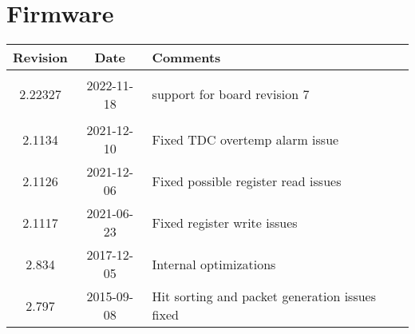 \section{Firmware}
\begin{tabularx}{\textwidth}{|c|c|X|}
    \hline
    Revision & Date & Comments\\
    \hline\hline
    \hypertarget{fwrev}{2.22327} & 2022-11-18 & support for board revision 7\\
    \hline
    2.1134 & 2021-12-10 & Fixed TDC overtemp alarm issue\\
    \hline
    2.1126 & 2021-12-06 & Fixed possible register read issues\\
    \hline
    2.1117 & 2021-06-23 & Fixed register write issues\\
    \hline
    2.834 & 2017-12-05 & Internal optimizations\\
    \hline
    2.797 & 2015-09-08 & Hit sorting and packet generation issues fixed\\
    \hline
\end{tabularx}
